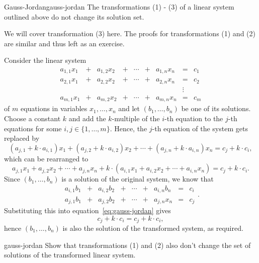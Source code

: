 \begin{theorem}{Gauss-Jordan}{gauss-jordan}
 The transformations (1) - (3) of a linear system outlined above do not change
 its solution set.
\end{theorem}
\begin{thmproof}
 We will cover transformation (3) here. The proofs for transformations (1) and
 (2) are similar and thus left as an exercise.

 Consider the linear system
 \[
  \begin{array}{rcrcccrcr}
   a_{1,1}x_1 & + & a_{1,2}x_2 & + & \cdots & + & a_{1,n}x_n & = & c_1\\
   a_{2,1}x_1 & + & a_{2,2}x_2 & + & \cdots & + & a_{2,n}x_n & = & c_2\\
              &   &            &   &        &   &            & \vdots &\\
   a_{m,1}x_1 & + & a_{m,2}x_2 & + & \cdots & + & a_{m,n}x_n & = & c_m
  \end{array}
 \]
 of $m$ equations in variables $x_1,\ldots,x_n$ and let $(b_1,\ldots,b_n)$ be
 one of its solutions. Choose a constant $k$ and add the $k$-multiple of the
 $i$-th equation to the $j$-th equations for some $i,j \in \{1,\ldots,m\}$.
 Hence, the $j$-th equation of the system gets replaced by
 \[
  (a_{j,1} + k \cdot a_{i,1})x_1 + (a_{j,2} + k \cdot a_{i,2})x_2 + \cdots +
  (a_{j,n} + k \cdot a_{i,n})x_n = c_j + k \cdot c_i,
 \]
 which can be rearranged to
 \begin{equation}
  \label{eq:gauss-jordan}
  a_{j,1}x_1 + a_{j,2}x_2 + \cdots + a_{j,n}x_n + k \cdot (a_{i,1}x_1 +
  a_{i,2}x_2 + \cdots + a_{i,n}x_n) = c_j + k \cdot c_i.
 \end{equation}
 Since $(b_1,\ldots,b_n)$ is a solution of the original system, we know that
 \[
  \begin{array}{rcrcccrcr}
   a_{i,1}b_1 & + & a_{i,2}b_2 & + & \cdots & + & a_{i,n}b_n & = & c_i\\
   a_{j,1}b_1 & + & a_{j,2}b_2 & + & \cdots & + & a_{j,n}x_n & = & c_j
  \end{array}.
 \]
 Substituting this into equation~\eqref{eq:gauss-jordan} gives
 \[
  c_j + k \cdot c_i = c_j + k \cdot c_i,
 \]
 hence $(b_1,\ldots,b_n)$ is also the solution of the transformed system, as
 required.
\end{thmproof}

\begin{exercise}{}{gauss-jordan}
 Show that transformations (1) and (2) also don't change the set of solutions of
 the transformed linear system.
\end{exercise}

